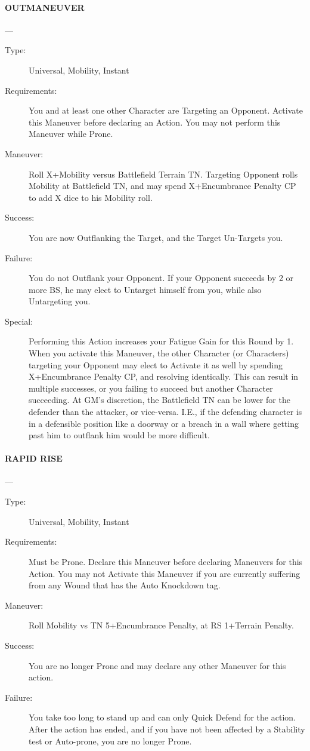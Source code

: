 \documentclass[oneside,11pt,english]{book}
\begin{document}
\paragraph{\large\label{man:OUTMANEUVER} OUTMANEUVER}---
\vspace{-10pt}\begin{description} 
\item [Type:] Universal, Mobility, Instant 
\item [Requirements:] You and at least one other Character are Targeting an Opponent. Activate this Maneuver 
before declaring an Action. You may not perform this Maneuver while Prone. 
\item [Maneuver:] Roll X+Mobility versus Battlefield Terrain TN. Targeting Opponent rolls Mobility at 
Battlefield TN, and may spend X+Encumbrance Penalty CP to add X dice to his Mobility roll. 
\item [Success:] You are now Outflanking the Target, and the Target Un-Targets you. 
\item [Failure:] You do not Outflank your Opponent. If your Opponent succeeds by 2 or more BS, he may elect 
to Untarget himself from you, while also Untargeting you. 
\item [Special:] Performing this Action increases your Fatigue Gain for this Round by 1. 
When you activate this Maneuver, the other Character (or Characters) targeting your Opponent may elect 
to Activate it as well by spending X+Encumbrance Penalty CP, and resolving identically. This can result 
in multiple successes, or you failing to succeed but another Character succeeding. 
At GM’s discretion, the Battlefield TN can be lower for the defender than the attacker, or vice-versa. I.E., 
if the defending character is in a defensible position like a doorway or a breach in a wall where getting 
past him to outflank him would be more difficult. 
\end{description}
\paragraph{\large\label{man:RAPID RISE} RAPID RISE}---
\vspace{-10pt}\begin{description} 
\item [Type:] Universal, Mobility, Instant 
\item [Requirements:] Must be Prone. Declare this Maneuver before declaring Maneuvers for this Action. You 
may not Activate this Maneuver if you are currently suffering from any Wound that has the Auto 
Knockdown tag. 
\item [Maneuver:] Roll Mobility vs TN 5+Encumbrance Penalty, at RS 1+Terrain Penalty. 
\item [Success:] You are no longer Prone and may declare any other Maneuver for this action. 
\item [Failure:] You take too long to stand up and can only Quick Defend for the action. After the action has 
ended, and if you have not been affected by a Stability test or Auto-prone, you are no longer Prone.
\end{description}
\end{document}
